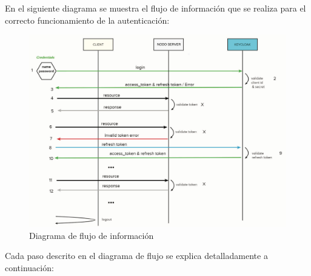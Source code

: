 En el siguiente diagrama se muestra el flujo de información que se realiza para el correcto funcionamiento de la autenticación:

\begin{figure}[H]
	\centering	
	\hspace*{-0.3in}
	\includegraphics[width=1.1\linewidth]{"Graphics/diagrama de flujo del prototipo del servicio"}
	\caption{Diagrama de flujo de información}
	\label{fig:diagrama-de-flujo-del-prototipo-del-servicio}
\end{figure}

Cada paso descrito en el diagrama de flujo se explica detalladamente a continuación: 

